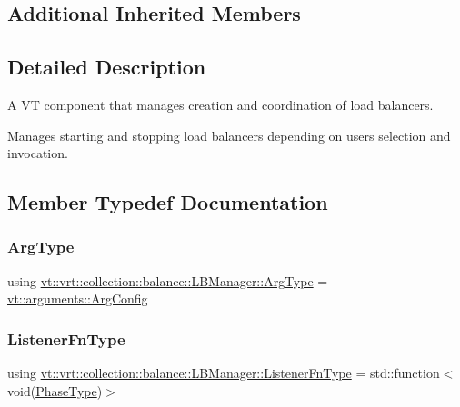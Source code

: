 \subsection*{Additional Inherited Members}


\subsection{Detailed Description}
A VT component that manages creation and coordination of load balancers. 

Manages starting and stopping load balancers depending on user\textquotesingle{}s selection and invocation. 

\subsection{Member Typedef Documentation}
\mbox{\label{structvt_1_1vrt_1_1collection_1_1balance_1_1_l_b_manager_a25c1321de5a8a52b7c2c5d0d400d55d4}} 
\subsubsection{\texorpdfstring{Arg\+Type}{ArgType}}
{\footnotesize\ttfamily using \hyperlink{structvt_1_1vrt_1_1collection_1_1balance_1_1_l_b_manager_a25c1321de5a8a52b7c2c5d0d400d55d4}{vt\+::vrt\+::collection\+::balance\+::\+L\+B\+Manager\+::\+Arg\+Type} =  \hyperlink{structvt_1_1arguments_1_1_arg_config}{vt\+::arguments\+::\+Arg\+Config}}

\mbox{\label{structvt_1_1vrt_1_1collection_1_1balance_1_1_l_b_manager_a1bb65b50c7cefb8c139a9f40a83ca18b}} 
\subsubsection{\texorpdfstring{Listener\+Fn\+Type}{ListenerFnType}}
{\footnotesize\ttfamily using \hyperlink{structvt_1_1vrt_1_1collection_1_1balance_1_1_l_b_manager_a1bb65b50c7cefb8c139a9f40a83ca18b}{vt\+::vrt\+::collection\+::balance\+::\+L\+B\+Manager\+::\+Listener\+Fn\+Type} =  std\+::function$<$void(\hyperlink{namespacevt_a46ce6733d5cdbd735d561b7b4029f6d7}{Phase\+Type})$>$}



